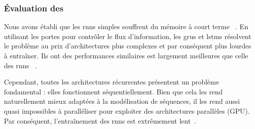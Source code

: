 \subsubsection{Évaluation des }

Nous avons établi que les \glspl{rnn} simples souffrent du mémoire à court terme%
~\cite{Bengio_Simard_Frasconi_1994,Pascanu_Mikolov_Bengio}.
En utilisant les portes pour contrôler le flux d'information,
les \glspl{gru} et \glspl{lstm} résolvent le problème au prix d'architectures plus complexes
et par conséquent plus lourdes à entraîner.
Ils ont des performances similaires est largement meilleures que celle des \glspl{rnn}%
~\cite{Chung_Gulcehre_Cho_Bengio_2014}.

Cependant, toutes les architectures récurrentes présentent un problème fondamental : 
elles fonctionnent séquentiellement.
Bien que cela les rend naturellement mieux adaptées à la modélisation de séquences,
il les rend aussi quasi impossibles à paralléliser pour exploiter des architectures parallèles (GPU).
Par conséquent, l'entraînement des \glspl{rnn} est extrêmement lent~\cite{Stahlberg_2020}.

